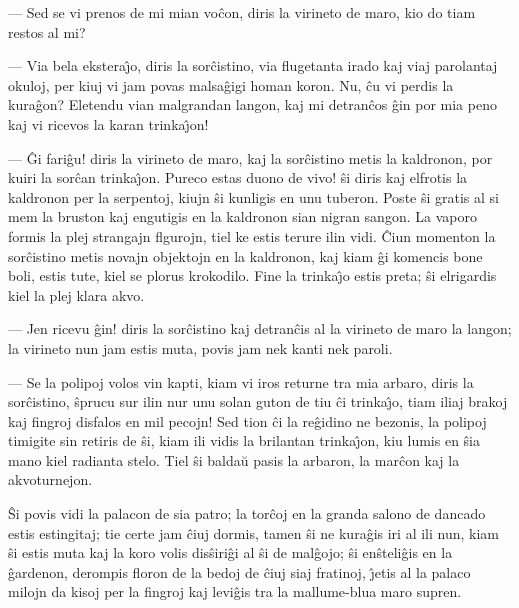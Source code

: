  --- Sed se vi prenos de mi mian vo\^con, diris la virineto de maro, kio
do tiam restos al mi?

 --- Via bela ekstera\^{\j}o, diris la sor\^cistino, via flugetanta irado
kaj viaj parolantaj okuloj, per kiuj vi jam povas malsa\^gigi homan
koron. Nu, \^cu vi perdis la kura\^gon? Eletendu vian malgrandan
langon, kaj mi detran\^cos \^gin por mia peno kaj vi ricevos la
karan trinka\^{\j}on!

 --- \^Gi fari\^gu! diris la virineto de maro, kaj la sor\^cistino metis
la kaldronon, por kuiri la sor\^can trinka\^{\j}on. Pureco estas
duono de vivo! \^si diris kaj elfrotis la kaldronon per la
serpentoj, kiujn \^si kunligis en unu tuberon. Poste \^si gratis al
si mem la bruston kaj engutigis en la kaldronon sian nigran sangon.
La vaporo formis la plej strangajn flgurojn, tiel ke estis terure
ilin vidi. \^Ciun momenton la sor\^cistino metis novajn objektojn en
la kaldronon, kaj kiam \^gi komencis bone boli, estis tute, kiel se
plorus krokodilo. Fine la trinka\^{\j}o estis preta; \^si elrigardis
kiel la plej klara akvo.

 --- Jen ricevu \^gin! diris la sor\^cistino kaj detran\^cis al la
virineto de maro la langon; la virineto nun jam estis muta, povis
jam nek kanti nek paroli.

 --- Se la polipoj volos vin kapti, kiam vi iros returne tra mia
arbaro, diris la sor\^cistino, \^sprucu sur ilin nur unu solan guton
de tiu \^ci trinka\^{\j}o, tiam iliaj brakoj kaj fingroj disfalos en
mil pecojn! Sed tion \^ci la re\^gidino ne bezonis, la polipoj
timigite sin retiris de \^si, kiam ili vidis la brilantan
trinka\^{\j}on, kiu lumis en \^sia mano kiel radianta stelo. Tiel
\^si balda\u u pasis la arbaron, la mar\^con kaj la akvoturnejon.

   \^Si povis vidi la palacon de sia patro; la tor\^coj en la granda
salono de dancado estis estingitaj; tie certe jam \^ciuj dormis,
tamen \^si ne kura\^gis iri al ili nun, kiam \^si estis muta kaj la
koro volis dis\^siri\^gi al \^si de mal\^gojo; \^si en\^steli\^gis
en la \^gardenon, derompis floron de la bedoj de \^ciuj siaj
fratinoj, \^{\j}etis al la palaco milojn da kisoj per la fingroj kaj
levi\^gis tra la mallume-blua maro supren.


